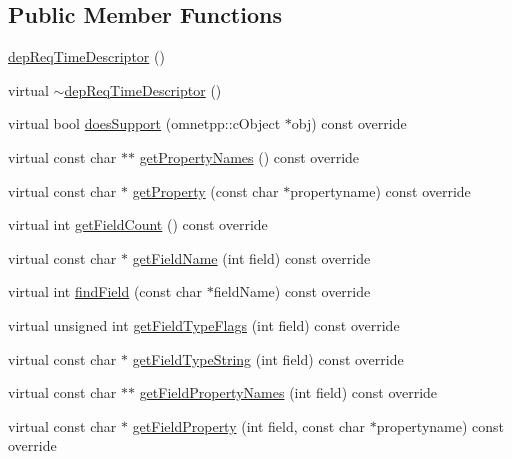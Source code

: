 \subsection*{Public Member Functions}
\begin{DoxyCompactItemize}
\item 
\hyperlink{classdep_req_time_descriptor_a3a2e6770051714ad9759ccbf1943dbff}{dep\+Req\+Time\+Descriptor} ()
\item 
virtual \hyperlink{classdep_req_time_descriptor_ab1e88d4e75d0da895acc20d8bbb28f45}{$\sim$dep\+Req\+Time\+Descriptor} ()
\item 
virtual bool \hyperlink{classdep_req_time_descriptor_a919fa187f7ad370fa29f389841b15310}{does\+Support} (omnetpp\+::c\+Object $\ast$obj) const override
\item 
virtual const char $\ast$$\ast$ \hyperlink{classdep_req_time_descriptor_a9f361ef5b255d6cf9846e52b67f5e837}{get\+Property\+Names} () const override
\item 
virtual const char $\ast$ \hyperlink{classdep_req_time_descriptor_a31c4397606ef6ed7e21621d51c4498fb}{get\+Property} (const char $\ast$propertyname) const override
\item 
virtual int \hyperlink{classdep_req_time_descriptor_a079564e7bacb79e8be6d3af9286ba54b}{get\+Field\+Count} () const override
\item 
virtual const char $\ast$ \hyperlink{classdep_req_time_descriptor_aa59fd9802c965acfb3876b88f26a2f0d}{get\+Field\+Name} (int field) const override
\item 
virtual int \hyperlink{classdep_req_time_descriptor_abdf669cde2ee94741db7eaa3bd4a61bf}{find\+Field} (const char $\ast$field\+Name) const override
\item 
virtual unsigned int \hyperlink{classdep_req_time_descriptor_ab1f3fdc98b07adfe47aecf2a122690ee}{get\+Field\+Type\+Flags} (int field) const override
\item 
virtual const char $\ast$ \hyperlink{classdep_req_time_descriptor_af28f6a1029b87177e101167d3fc89c3b}{get\+Field\+Type\+String} (int field) const override
\item 
virtual const char $\ast$$\ast$ \hyperlink{classdep_req_time_descriptor_aa20459216b1c8dfecebfed86c43aa6d2}{get\+Field\+Property\+Names} (int field) const override
\item 
virtual const char $\ast$ \hyperlink{classdep_req_time_descriptor_aee85faec811f0a52f2d112ea46689d73}{get\+Field\+Property} (int field, const char $\ast$propertyname) const override
\item 

\end{DoxyCompactItemize}
